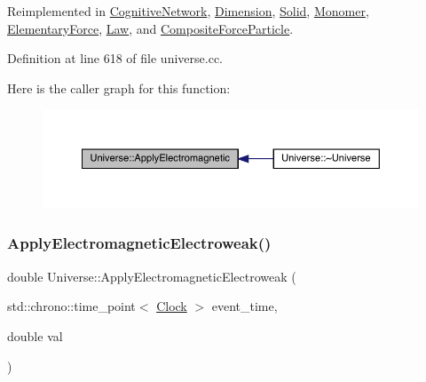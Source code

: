 Reimplemented in \hyperlink{class_cognitive_network_ae590ecb77db0a876425b9b74bcfe2bce}{Cognitive\+Network}, \hyperlink{class_dimension_a65bcd3c09792cf53b1f614eff49cf111}{Dimension}, \hyperlink{class_solid_ab546d607d6f0bf70dc5e6bbac8baf287}{Solid}, \hyperlink{class_monomer_ae64dfbf82610ae26427be9c824aef70f}{Monomer}, \hyperlink{class_elementary_force_a0045a3380e468c6cfdbefce829888c1f}{Elementary\+Force}, \hyperlink{class_law_a418791aee2a9204a99d3a917b86fafd3}{Law}, and \hyperlink{class_composite_force_particle_afa4dc18258722b3c85fbc9789a4297a5}{Composite\+Force\+Particle}.



Definition at line 618 of file universe.\+cc.

Here is the caller graph for this function\+:
\nopagebreak
\begin{figure}[H]
\begin{center}
\leavevmode
\includegraphics[width=350pt]{class_universe_a1f787da78fa196ba635db21a9e91dabb_icgraph}
\end{center}
\end{figure}
\mbox{\label{class_universe_a4c36c1ab30db993307f88363dde5e8c5}} 
\subsubsection{\texorpdfstring{Apply\+Electromagnetic\+Electroweak()}{ApplyElectromagneticElectroweak()}}
{\footnotesize\ttfamily double Universe\+::\+Apply\+Electromagnetic\+Electroweak (\begin{DoxyParamCaption}\item[{std\+::chrono\+::time\+\_\+point$<$ \hyperlink{universe_8h_a0ef8d951d1ca5ab3cfaf7ab4c7a6fd80}{Clock} $>$}]{event\+\_\+time,  }\item[{double}]{val }\end{DoxyParamCaption})\hspace{0.3cm}{\ttfamily [virtual]}}



